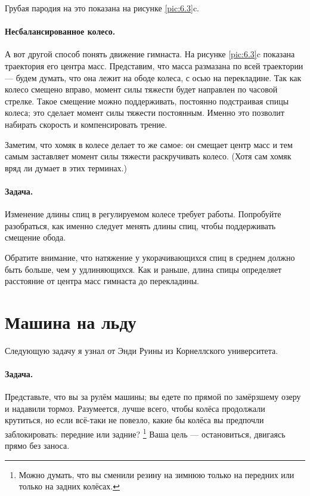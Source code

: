 Грубая пародия на это показана на рисунке \ref{pic:6.3}c.

\paragraph{Несбалансированное колесо.}
А вот другой способ понять движение гимнаста.
На рисунке \ref{pic:6.3}c показана траектория его центра масс.
Представим, что масса размазана по всей траектории --- будем думать, что она лежит на ободе колеса, с осью на перекладине.
Так как колесо смещено вправо, момент силы тяжести будет направлен по часовой стрелке.
Такое смещение можно поддерживать, постоянно подстраивая спицы колеса;
это сделает момент силы тяжести постоянным.
Именно это позволит набирать скорость и компенсировать трение.

Заметим, что хомяк в колесе делает то же самое:
он смещает центр масс и тем самым заставляет момент силы тяжести раскручивать колесо.
(Хотя сам хомяк вряд ли думает в этих терминах.)

\paragraph{Задача.}
Изменение длины спиц в регулируемом колесе требует работы.
Попробуйте разобраться, как именно следует менять длины спиц, чтобы поддерживать смещение обода.

Обратите внимание, что натяжение у укорачивающихся спиц в среднем должно быть больше, чем у удлиняющихся.
Как и раньше, длина спицы определяет расстояние от центра масс гимнаста до перекладины.

\section{Машина на льду}

Следующую задачу я узнал от Энди Руины
из Корнеллского университета.

\paragraph{Задача.}
Представьте, что вы за рулём машины;
вы едете по прямой по замёрзшему озеру и надавили тормоз.
Разумеется, лучше всего, чтобы колёса продолжали крутиться,
но если всё-таки не повезло, какие бы колёса вы предпочли заблокировать: передние или задние?%
\footnote{Можно думать, что вы сменили резину на зимнюю только на передних или только на задних колёсах.\pr}
Ваша цель --- остановиться, двигаясь прямо без заноса.

